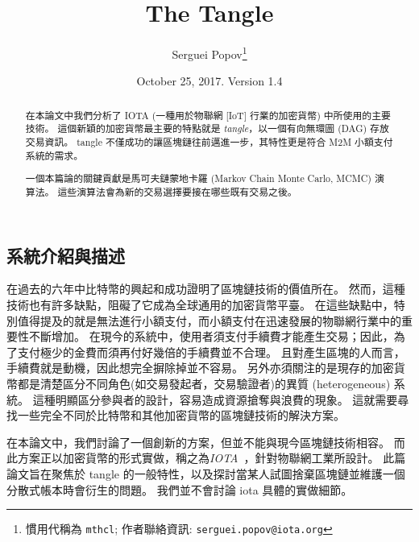 \documentclass[12pt]{article}
\title{The Tangle}
\author{Serguei Popov\thanks{
慣用代稱為 \texttt{mthcl}; 作者聯絡資訊:
\texttt{serguei.popov@iota.org}}
}
\date{October 25, 2017. Version 1.4}
\begin{document}
\begin{CJK}{UTF8}{bkai}
 \maketitle
\begin{abstract}  

在本論文中我們分析了 IOTA (一種用於物聯網 [IoT] 行業的加密貨幣) 中所使用的主要技術。
這個新穎的加密貨幣最主要的特點就是 \emph{tangle}，以一個有向無環圖 (DAG) 存放交易資訊。
tangle 不僅成功的讓區塊鏈往前邁進一步，其特性更是符合 M2M 小額支付系統的需求。

一個本篇論的關鍵貢獻是馬可夫鏈蒙地卡羅 (Markov Chain Monte Carlo, MCMC) 演算法。
這些演算法會為新的交易選擇要接在哪些既有交易之後。                                        

\end{abstract}

\section{系統介紹與描述}
\label{s_general}

在過去的六年中比特幣的興起和成功證明了區塊鏈技術的價值所在。
然而，這種技術也有許多缺點，阻礙了它成為全球通用的加密貨幣平臺。
在這些缺點中，特別值得提及的就是無法進行小額支付，而小額支付在迅速發展的物聯網行業中的重要性不斷增加。
在現今的系統中，使用者須支付手續費才能產生交易；因此，為了支付極少的金費而須再付好幾倍的手續費並不合理。
且對產生區塊的人而言，手續費就是動機，因此想完全摒除掉並不容易。
另外亦須關注的是現存的加密貨幣都是清楚區分不同角色(如交易發起者，交易驗證者)的異質 (heterogeneous) 系統。
這種明顯區分參與者的設計，容易造成資源搶奪與浪費的現象。
這就需要尋找一些完全不同於比特幣和其他加密貨幣的區塊鏈技術的解決方案。

在本論文中，我們討論了一個創新的方案，但並不能與現今區塊鏈技術相容。
而此方案正以加密貨幣的形式實做，稱之為\emph{IOTA}~\cite{iota}，針對物聯網工業所設計。
此篇論文旨在聚焦於 tangle 的一般特性，以及探討當某人試圖捨棄區塊鏈並維護一個分散式帳本時會衍生的問題。
我們並不會討論 iota 具體的實做細節。


\end{CJK}
\end{document}
